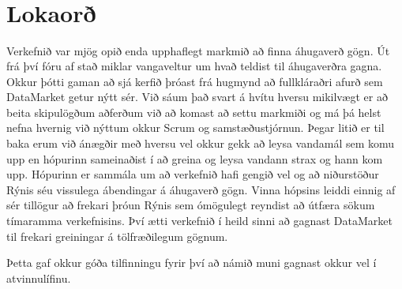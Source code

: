 \documentclass{article}
\begin{document}
\hfil \\
\hfil \\
\hfil \\
\hfil \\

\newpage

\section{Lokaorð}
Verkefnið var mjög opið enda upphaflegt markmið að finna áhugaverð gögn. 
Út frá því fóru af stað miklar vangaveltur um hvað teldist til áhugaverðra gagna. 
Okkur þótti gaman að sjá kerfið þróast frá hugmynd að fullkláraðri afurð sem DataMarket getur nýtt sér.
Við sáum það svart á hvítu hversu mikilvægt er að beita skipulögðum aðferðum við að komast að settu markmiði og má þá helst nefna hvernig
við nýttum okkur Scrum og samstæðustjórnun. Þegar litið er til baka erum við ánægðir með hversu vel okkur gekk að leysa 
vandamál sem komu upp en hópurinn sameinaðist í að greina og leysa vandann strax og hann kom upp.
Hópurinn er sammála um að verkefnið hafi gengið vel og að niðurstöður Rýnis séu vissulega ábendingar á áhugaverð gögn.
Vinna hópsins leiddi einnig af sér tillögur að frekari þróun Rýnis sem ómögulegt reyndist að útfæra sökum tímaramma verkefnisins.
Því ætti verkefnið í heild sinni að gagnast DataMarket til frekari greiningar á tölfræðilegum gögnum.

Þetta gaf okkur góða tilfinningu fyrir því að námið muni gagnast okkur vel í atvinnulífinu. 
\end{document}
